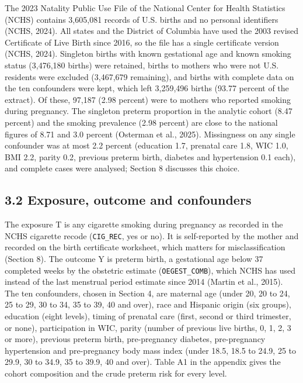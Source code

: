 \documentclass[11pt,letterpaper]{article}
\begin{document}
The 2023 Natality Public Use File of the National Center for Health Statistics (NCHS) contains 3,605,081 records of U.S. births and no personal identifiers (NCHS, 2024). All states and the District of Columbia have used the 2003 revised Certificate of Live Birth since 2016, so the file has a single certificate version (NCHS, 2024). Singleton births with known gestational age and known smoking status (3,476,180 births) were retained, births to mothers who were not U.S. residents were excluded (3,467,679 remaining), and births with complete data on the ten confounders were kept, which left 3,259,496 births (93.77 percent of the extract). Of these, 97,187 (2.98 percent) were to mothers who reported smoking during pregnancy. The singleton preterm proportion in the analytic cohort (8.47 percent) and the smoking prevalence (2.98 percent) are close to the national figures of 8.71 and 3.0 percent (Osterman et al., 2025). Missingness on any single confounder was at most 2.2 percent (education 1.7, prenatal care 1.8, WIC 1.0, BMI 2.2, parity 0.2, previous preterm birth, diabetes and hypertension 0.1 each), and complete cases were analysed; Section 8 discusses this choice.

\subsection*{3.2 Exposure, outcome and confounders}

The exposure T is any cigarette smoking during pregnancy as recorded in the NCHS cigarette recode (\texttt{CIG\_REC}, yes or no). It is self-reported by the mother and recorded on the birth certificate worksheet, which matters for misclassification (Section 8). The outcome Y is preterm birth, a gestational age below 37 completed weeks by the obstetric estimate (\texttt{OEGEST\_COMB}), which NCHS has used instead of the last menstrual period estimate since 2014 (Martin et al., 2015). The ten confounders, chosen in Section 4, are maternal age (under 20, 20 to 24, 25 to 29, 30 to 34, 35 to 39, 40 and over), race and Hispanic origin (six groups), education (eight levels), timing of prenatal care (first, second or third trimester, or none), participation in WIC, parity (number of previous live births, 0, 1, 2, 3 or more), previous preterm birth, pre-pregnancy diabetes, pre-pregnancy hypertension and pre-pregnancy body mass index (under 18.5, 18.5 to 24.9, 25 to 29.9, 30 to 34.9, 35 to 39.9, 40 and over). Table A1 in the appendix gives the cohort composition and the crude preterm risk for every level.
\end{document}
